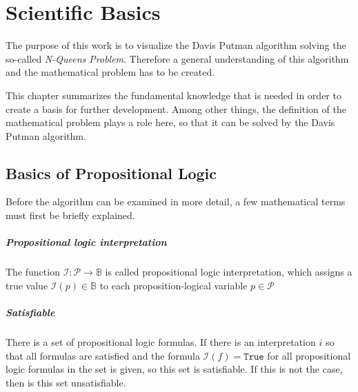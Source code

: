 

\chapter{Scientific Basics}
\label{ch:sciBasics}
The purpose of this work is to visualize the Davis Putman algorithm solving the so-called \textit{N-Queens Problem}. 
Therefore a general understanding of this algorithm and the mathematical problem has to be created.

This chapter summarizes the fundamental knowledge that is needed in order to create a basis for further development. 
Among other things, the definition of the mathematical problem plays a role here, so that it can be solved by the Davis Putman algorithm.

\section{Basics of Propositional Logic}
\label{sec:sciProLogic}
Before the algorithm can be examined in more detail, a few mathematical terms must first be briefly explained.

\paragraph{Propositional logic interpretation}
The function $\mathcal{I}:\mathcal{P} \rightarrow \mathbb{B}$ is called propositional logic interpretation, which assigns a true value $\mathcal{I}(p) \in \mathbb{B}$ to each proposition-logical variable $p\in \mathcal{P}$

\paragraph{Satisfiable}
There is a set of propositional logic formulas. If there is an interpretation $i$ so that all formulas are satisfied and the formula $\mathcal{I}(f) = \texttt{True}$ \quad for all propositional logic formulas in the set is given, so this set is satisfiable. If this is not the case, then is this set unsatisfiable.

